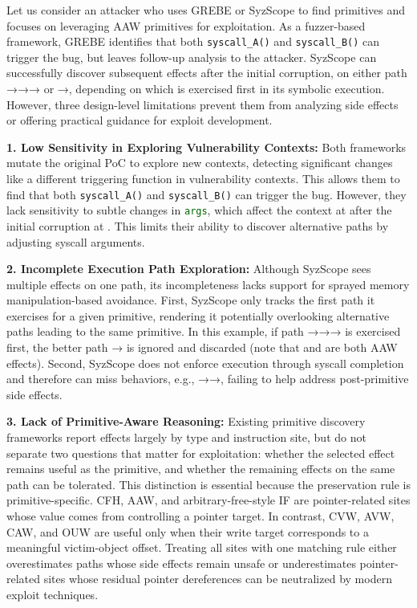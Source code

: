 Let us consider an attacker who uses GREBE or SyzScope to find primitives and focuses on leveraging AAW primitives for exploitation. As a fuzzer-based framework, GREBE identifies that both \texttt{syscall\_A()} and \texttt{syscall\_B()} can trigger the bug, but leaves follow-up analysis to the attacker. SyzScope can successfully discover subsequent effects after the initial corruption, on either path →→→ or →, depending on which is exercised first in its symbolic execution. However, three design-level limitations prevent them from analyzing side effects or offering practical guidance for exploit development.



\noindent\textbf{1. Low Sensitivity in Exploring Vulnerability Contexts:} Both frameworks mutate the original PoC to explore new contexts, detecting significant changes like a different triggering function in vulnerability contexts. This allows them to find that both \texttt{syscall\_A()} and \texttt{syscall\_B()} can trigger the bug. However, they lack sensitivity to subtle changes in \textcolor{DarkGreen}{\texttt{args}}, which affect the context at  after the initial corruption at . This limits their ability to discover alternative paths by adjusting syscall arguments.

\noindent\textbf{2. Incomplete Execution Path Exploration:} Although SyzScope sees multiple effects on one path, its incompleteness lacks support for sprayed memory manipulation-based avoidance. First, SyzScope only tracks the first path it exercises for a given primitive, rendering it potentially overlooking alternative paths leading to the same primitive. In this example, if path →→→ is exercised first, the better path → is ignored and discarded (note that  and  are both AAW effects). Second, SyzScope does not enforce execution through syscall completion and therefore can miss behaviors, e.g., →→, failing to help address post-primitive side effects.

\noindent\textbf{3. Lack of Primitive-Aware Reasoning:} Existing primitive discovery frameworks report effects largely by type and instruction site, but do not separate two questions that matter for exploitation: whether the selected effect remains useful as the primitive, and whether the remaining effects on the same path can be tolerated. This distinction is essential because the preservation rule is primitive-specific. CFH, AAW, and arbitrary-free-style IF are pointer-related sites whose value comes from controlling a pointer target. In contrast, CVW, AVW, CAW, and OUW are useful only when their write target corresponds to a meaningful victim-object offset. Treating all sites with one matching rule either overestimates paths whose side effects remain unsafe or underestimates pointer-related sites whose residual pointer dereferences can be neutralized by modern exploit techniques.







